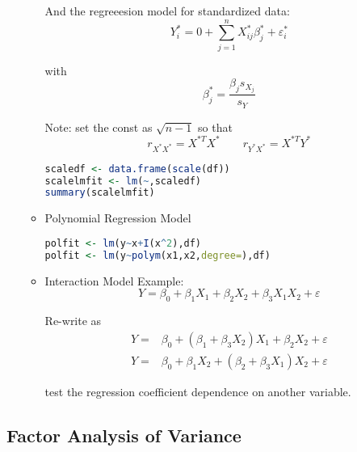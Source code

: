 \begin{itemize}[topsep=2pt,itemsep=0pt]
\begin{itemize}[topsep=2pt,itemsep=0pt]
And the regreeesion model for standardized data:
\begin{equation}
    Y^*_i=0+\sum_{j=1}^nX_{ij}^*\beta _j^*+\varepsilon _i^* 
\end{equation}

with
\begin{equation}
    \beta _j^*=\dfrac{\beta _js_{X_j}}{s_Y} 
\end{equation}

Note: set the const as $ \sqrt{n-1} $ so that 
\begin{equation}
    r_{X^*X^*}=X^{*T}X^* \qquad r_{Y^*X^*}=X^{*T}Y^*
\end{equation}
\begin{rcode}
\begin{lstlisting}[language=R]
scaledf <- data.frame(scale(df))
scalelmfit <- lm(~,scaledf)
summary(scalelmfit)
\end{lstlisting}
\end{rcode}
    \item Polynomial Regression Model

\begin{rcode}
\begin{lstlisting}[language=R]
polfit <- lm(y~x+I(x^2),df)
polfit <- lm(y~polym(x1,x2,degree=),df)
\end{lstlisting}
\end{rcode}
    
    \item Interaction Model
    Example: 
    \begin{equation}
        Y=\beta _0+\beta _1X_1+\beta _2X_2+\beta _{3}X_1X_2+\varepsilon  
    \end{equation}
    
    Re-write as
    \begin{align*}
        Y=&\beta _0+(\beta _1+\beta _3X_2)X_1+\beta _2X_2+\varepsilon \\
        Y=&\beta _0+\beta _1X_2+(\beta _2+\beta _3X_1)X_2+\varepsilon 
    \end{align*}

    test the regression coefficient dependence on another variable.

\end{itemize}
   
      
\end{itemize}





\subsection{Factor Analysis of Variance}
